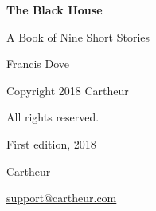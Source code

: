 \documentclass[11pt,oneside]{book}
\begin{document}
\frontmatter
\thispagestyle{empty}
\vspace*{\fill}
\begin{center}
{\Huge \textbf{The Black House}\par}
\vspace{1em}
{\Large A Book of Nine Short Stories\par}
\vspace{2em}
{\Large Francis Dove\par}
\end{center}
\vspace*{\fill}
\clearpage

\thispagestyle{empty}
\vspace*{\fill}
\begin{center}
Copyright \textcopyright{} 2018 Cartheur

All rights reserved.

\vspace{1em}
First edition, 2018

Cartheur

\href{mailto:support@cartheur.com}{support@cartheur.com}
\end{center}
\vspace*{\fill}
\clearpage

\tableofcontents
\clearpage

\mainmatter

\end{document}
